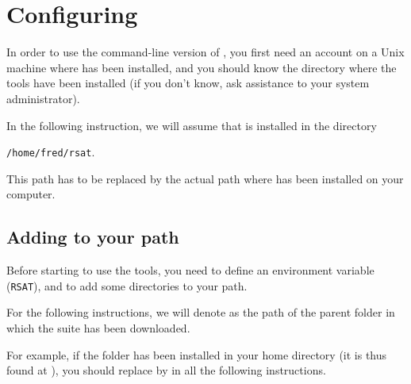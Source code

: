 \section{Configuring \RSAT}


In order to use the command-line version of \RSAT, you first need an
account on a Unix machine where \RSAT has been installed, and you
should know the directory where the tools have been installed (if you
don't know, ask assistance to your system administrator).

In the following instruction, we will assume that \RSAT is installed
in the directory 

\texttt{/home/fred/rsat}. 

This path has to be
replaced by the actual path where \RSAT has been installed on your
computer.

\subsection{Adding \RSAT  to your path}

Before starting to use the tools, you need to define an environment
variable (\texttt{RSAT}), and to add some directories to your path.

For the following instructions, we will denote as 
the path of the parent folder in which the \RSAT suite has been
downloaded.

For example, if the  folder has been installed in your
home directory (it is thus found at ), you
should replace  by  in all the
following instructions. 


